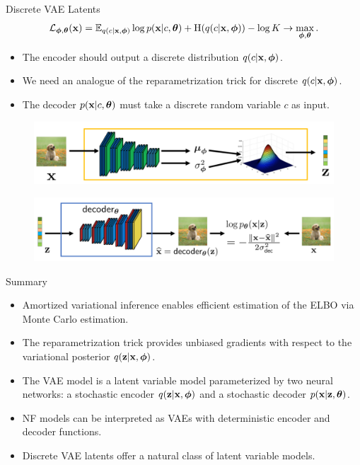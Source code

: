 \documentclass{beamer}
\begin{document}
\begin{frame}{Discrete VAE Latents}
	\[
		\mathcal{L}_{\boldsymbol{\phi}, \boldsymbol{\theta}}(\mathbf{x})  = \mathbb{E}_{q(c | \mathbf{x}, \boldsymbol{\phi})} \log p(\mathbf{x} | c, \boldsymbol{\theta}) + \mathrm{H}(q(c | \mathbf{x}, \boldsymbol{\phi})) - \log K \rightarrow \max_{\boldsymbol{\phi}, \boldsymbol{\theta}}.
	\]
	\eqpause
	\vspace{-0.5cm}
	\begin{itemize}
		\item The encoder should output a discrete distribution $q(c | \mathbf{x}, \boldsymbol{\phi})$.
					\item We need an analogue of the reparametrization trick for discrete $q(c | \mathbf{x}, \boldsymbol{\phi})$.
		\item The decoder $p(\mathbf{x} | c, \boldsymbol{\theta})$ must take a discrete random variable $c$ as input.
	\end{itemize}
	\begin{figure}[h]
		\centering
		\includegraphics[width=0.7\linewidth]{figs/vae-encoder}
	\end{figure}
	\begin{figure}[h]
		\centering
		\includegraphics[width=0.9\linewidth]{figs/vae-decoder}
	\end{figure}
\end{frame}
\begin{frame}{Summary}
	\begin{itemize}
		\item Amortized variational inference enables efficient estimation of the ELBO via Monte Carlo estimation.
		\vfill
		\item The reparametrization trick provides unbiased gradients with respect to the variational posterior $q(\mathbf{z} | \mathbf{x}, \boldsymbol{\phi})$.
		\vfill
		\item The VAE model is a latent variable model parameterized by two neural networks: a stochastic encoder $q(\mathbf{z} | \mathbf{x}, \boldsymbol{\phi})$ and a stochastic decoder $p(\mathbf{x} | \mathbf{z}, \boldsymbol{\theta})$.
		\vfill
		\item NF models can be interpreted as VAEs with deterministic encoder and decoder functions.
		\vfill
		\item Discrete VAE latents offer a natural class of latent variable models.
	\end{itemize}
\end{frame}
\end{document}
